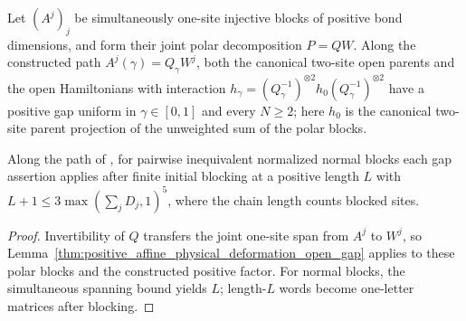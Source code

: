 \begin{lemma}
    \label{thm:constructed_isometric_deformation_open_gap}
    \leanok
    Let $(A^j)_j$ be simultaneously one-site injective blocks of positive
    bond dimensions, and form their joint polar decomposition $P=QW$.
    Along the constructed path $A^j(\gamma)=Q_\gamma W^j$, both the
    canonical two-site open parents and the open Hamiltonians with
    interaction $h_\gamma=(Q_\gamma^{-1})^{\otimes2}
        h_0(Q_\gamma^{-1})^{\otimes2}$ have a positive gap uniform in
    $\gamma\in[0,1]$ and every $N\geq2$; here $h_0$ is the canonical
    two-site parent projection of the unweighted sum of the polar blocks.

    Along the path of \cite[lines~575--625, Appendix~A]{Schuch2011Phases}, for
    pairwise inequivalent normalized normal blocks each gap assertion applies
    after finite initial blocking at a positive length $L$ with
    $L+1\leq3\max(\sum_jD_j,1)^5$, where the chain length counts blocked
    sites.
\end{lemma}

\begin{proof}
    \leanok
    Invertibility of $Q$ transfers the joint one-site span from $A^j$ to
    $W^j$, so Lemma~\ref{thm:positive_affine_physical_deformation_open_gap}
    applies to these polar blocks and the constructed positive factor. For
    normal blocks, the simultaneous spanning bound yields $L$; length-$L$
    words become one-letter matrices after blocking.
\end{proof}

